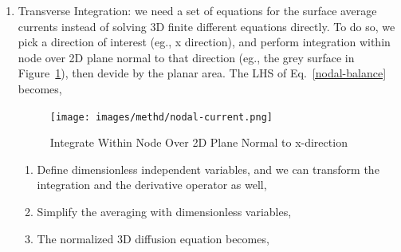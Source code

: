 \documentclass{school-22.211-notes}
\begin{document}
\begin{enumerate}
\item Transverse Integration: we need a set of equations for the surface average currents instead of solving 3D finite different equations directly. To do so, we pick a direction of interest (eg., x direction), and perform integration within node over 2D plane normal to that direction (eg., the grey surface in Figure~\ref{nodal-current}), then devide by the planar area. The LHS of Eq.~\ref{nodal-balance} becomes, 
\begin{figure}[ht]
  \centering
  \texttt{[image: images/methd/nodal-current.png]}
  \caption{Integrate Within Node Over 2D Plane Normal to x-direction} \label{nodal-current}
\end{figure}
  \begin{enumerate}
  \item Define dimensionless independent variables,
    and we can transform the integration and the derivative operator as well, 

  \item Simplify the averaging with dimensionless variables,

  \item The normalized 3D diffusion equation becomes, 


\end{enumerate}
\end{enumerate}
\end{document}
